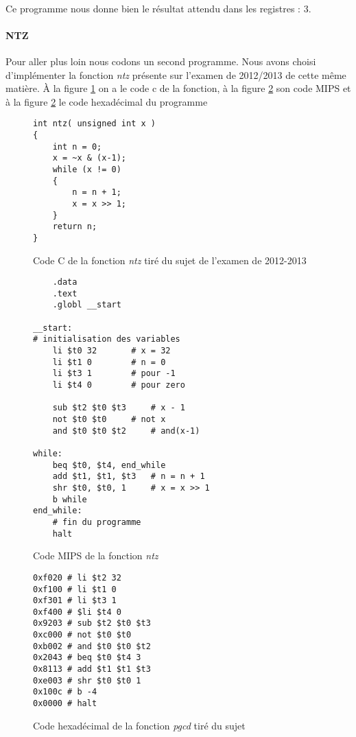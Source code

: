 \paragraph{}{
	Ce programme nous donne bien le résultat attendu dans les registres : $3$.
}

\paragraph{NTZ}{
	Pour aller plus loin nous codons un second programme. Nous avons choisi
	d'implémenter la fonction \textit{ntz} présente sur l'examen de 2012/2013 de cette
	même matière. \newline
	À la figure \ref{ntz_c} on a le code c de la fonction, à la figure \ref{ntz_asm}
	son code MIPS et à la figure \ref{ntz_asm} le code hexadécimal du programme
}

\begin{figure}
	\lstset{
		frame=single,
		numbers=left,
		numbersep=5pt,
		language=C++
	}
	\begin{lstlisting}
int ntz( unsigned int x )
{
	int n = 0;
	x = ~x & (x-1);
	while (x != 0)
	{
		n = n + 1;
		x = x >> 1;
	}
	return n;
}
	\end{lstlisting}
	\caption{
		\label{ntz_c}
		Code C de la fonction \textit{ntz} tiré du sujet de l’examen de 2012-2013
	}
\end{figure}

\begin{figure}
	\begin{lstlisting}
	.data
	.text
	.globl __start
	
__start:
# initialisation des variables
	li $t0 32		# x = 32
	li $t1 0		# n = 0
	li $t3 1		# pour -1
	li $t4 0		# pour zero
		
	sub $t2 $t0 $t3		# x - 1
	not $t0 $t0		# not x
	and $t0 $t0 $t2		# and(x-1)
	
while:
	beq $t0, $t4, end_while	
	add $t1, $t1, $t3	# n = n + 1
	shr $t0, $t0, 1		# x = x >> 1
	b while			
end_while:
	# fin du programme
	halt
	\end{lstlisting}
	\caption{
		\label{ntz_asm}
		Code MIPS de la fonction \textit{ntz}
	}
\end{figure}

\begin{figure}
	\lstset{
		basicstyle=\ttfamily,
		frame=single,
		numbers=left,
		numbersep=5pt,
		language=[mips]Assembler
	}
	\begin{lstlisting}
0xf020 # li $t2 32
0xf100 # li $t1 0
0xf301 # li $t3 1
0xf400 # $li $t4 0
0x9203 # sub $t2 $t0 $t3
0xc000 # not $t0 $t0
0xb002 # and $t0 $t0 $t2
0x2043 # beq $t0 $t4 3
0x8113 # add $t1 $t1 $t3
0xe003 # shr $t0 $t0 1
0x100c # b -4
0x0000 # halt
	\end{lstlisting}
	\caption{
		\label{ntz_hexa}
		Code hexadécimal de la fonction \textit{pgcd} tiré du sujet
	}
\end{figure}

